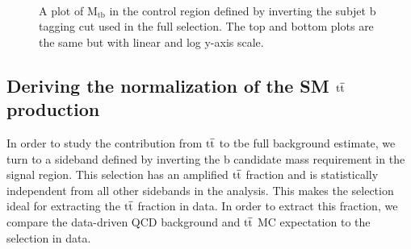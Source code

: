 \begin{figure}[Htcb]
\centering
{}\\
\caption{A plot of $\mathrm{M_{tb}}$ in the control region defined by inverting the subjet b tagging cut used in the full selection.  The top and bottom plots are the same but with linear and log y-axis scale.}
\label{figs:NewMtbSB3}
\end{figure}

\subsection{Deriving the normalization of the SM $\mathrm{t\overline{t}}$ production}
\label{sec:ttbarsideband}
In order to study the contribution from $\mathrm{t\overline{t}}$ to tbe full background estimate, we turn to a sideband defined by inverting the b candidate mass requirement in the signal region.
This selection has an amplified $\mathrm{t\overline{t}}$ fraction and is statistically independent from all other sidebands in the analysis.  
This makes the selection ideal for extracting the $\mathrm{t\overline{t}}$ fraction in data.  
In order to extract this fraction, we compare the data-driven QCD background and $\mathrm{t\overline{t}}$ MC expectation to the selection in data.  

